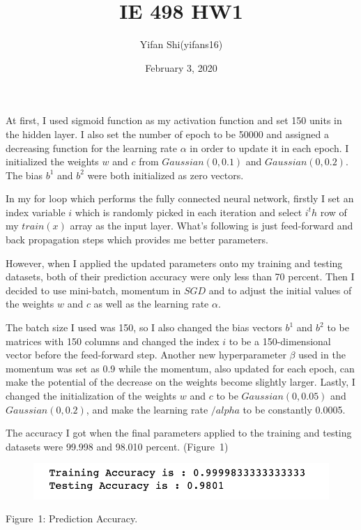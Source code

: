 \documentclass{article}
\title{IE 498 HW1}
\author{Yifan Shi(yifans16)}
\date{February 3, 2020}
\begin{document}
\maketitle

At first, I used sigmoid function as 
my activation function and set 150 units 
in the hidden layer. I also set the number 
of epoch to be 50000 and assigned a 
decreasing function for the learning rate 
$\alpha$ in order to update it in each epoch. 
 I initialized the weights $w$ and $c$ from 
 $Gaussian(0,0.1)$ and $Gaussian(0,0.2)$. 
 The bias $b^1$ and $b^2$ were both initialized 
 as zero vectors.


 In my for loop which performs the fully
 connected neural network, firstly I set an 
 index variable $i$ which is randomly picked 
 in each iteration and select $i^th$ row of
 my $train(x)$ array as the input layer. What's 
 following is just feed-forward and back 
 propagation steps which provides me better 
 parameters. 


However, when I applied the updated parameters 
onto my training and testing datasets, both of 
their prediction accuracy were only less than 70 
percent. Then I decided to use mini-batch, 
momentum in $SGD$ and to adjust the initial values
of the weights $w$ and $c$ as well as the learning 
rate $\alpha$.


The batch size I used was 150, so I also changed
the bias vectors $b^1$ and $b^2$ to be matrices 
with 150 columns and changed the index $i$ to be 
a 150-dimensional vector before the feed-forward 
step. Another new hyperparameter $\beta$ used in 
the momentum was set as 0.9 while the momentum, 
also updated for each epoch, can make the potential 
of the decrease on the weights become slightly 
larger. Lastly, I changed the initialization of 
the weights $w$ and $c$ to be $Gaussian(0,0.05)$ 
and $Gaussian(0,0.2)$, and make the learning rate
$/alpha$ to be constantly 0.0005. 


The accuracy I got when the final parameters 
applied to the training and testing datasets 
were 99.998 and 98.010 percent. (Figure\ 1)

\begin{figure}[h]
    \centering
    \includegraphics[scale=0.6]{accuracy.png}
  \end{figure}
\centering Figure\ 1: Prediction Accuracy.
\end{document}
